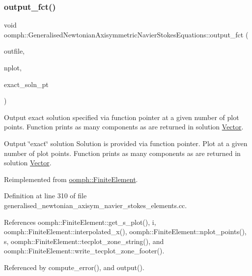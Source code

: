 \subsubsection{\texorpdfstring{output\+\_\+fct()}{output\_fct()}\hspace{0.1cm}{\footnotesize\ttfamily [1/2]}}
{\footnotesize\ttfamily void oomph\+::\+Generalised\+Newtonian\+Axisymmetric\+Navier\+Stokes\+Equations\+::output\+\_\+fct (\begin{DoxyParamCaption}\item[{std\+::ostream \&}]{outfile,  }\item[{const unsigned \&}]{nplot,  }\item[{\hyperlink{classoomph_1_1FiniteElement_a690fd33af26cc3e84f39bba6d5a85202}{Finite\+Element\+::\+Steady\+Exact\+Solution\+Fct\+Pt}}]{exact\+\_\+soln\+\_\+pt }\end{DoxyParamCaption})\hspace{0.3cm}{\ttfamily [virtual]}}



Output exact solution specified via function pointer at a given number of plot points. Function prints as many components as are returned in solution \hyperlink{classoomph_1_1Vector}{Vector}. 

Output \char`\"{}exact\char`\"{} solution Solution is provided via function pointer. Plot at a given number of plot points. Function prints as many components as are returned in solution \hyperlink{classoomph_1_1Vector}{Vector}. 

Reimplemented from \hyperlink{classoomph_1_1FiniteElement_a22b695c714f60ee6cd145be348042035}{oomph\+::\+Finite\+Element}.



Definition at line 310 of file generalised\+\_\+newtonian\+\_\+axisym\+\_\+navier\+\_\+stokes\+\_\+elements.\+cc.



References oomph\+::\+Finite\+Element\+::get\+\_\+s\+\_\+plot(), i, oomph\+::\+Finite\+Element\+::interpolated\+\_\+x(), oomph\+::\+Finite\+Element\+::nplot\+\_\+points(), s, oomph\+::\+Finite\+Element\+::tecplot\+\_\+zone\+\_\+string(), and oomph\+::\+Finite\+Element\+::write\+\_\+tecplot\+\_\+zone\+\_\+footer().



Referenced by compute\+\_\+error(), and output().

\mbox{\label{classoomph_1_1GeneralisedNewtonianAxisymmetricNavierStokesEquations_acb92d58063aadbfeff72e1ca134d81aa}} 
